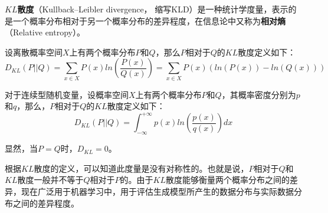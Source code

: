 

\textbf{$KL$散度}（Kullback–Leibler divergence， 缩写KLD）是一种统计学度量，表示的是一个概率分布相对于另一个概率分布的差异程度，在信息论中又称为\textbf{相对熵}（Relative entropy）。

设离散概率空间$X$上有两个概率分布$P$和$Q$，那么$P$相对于$Q$的$KL$散度定义如下：
\begin{equation}
D_{KL}(P||Q)=\sum_{x\in X}P(x)ln(\frac{P(x)}{Q(x)})=\sum_{x\in X}P(x)(ln(P(x))-ln(Q(x)))
\end{equation}

对于连续型随机变量，设概率空间$X$上有两个概率分布$P$和$Q$，其概率密度分别为$p$和$q$，那么，$P$相对于$Q$的$KL$散度定义如下：
\begin{equation}
D_{KL}(P||Q)=\int_{-\infty}^{+\infty}p(x)ln(\frac{p(x)}{q(x)})dx
\end{equation}

显然，当$P=Q$时，$D_{KL}=0$。

根据$KL$散度的定义，可以知道此度量是没有对称性的。也就是说，$P$相对于$Q$和$KL$散度一般并不等于$Q$相对于$P$的。由于$KL$散度能够衡量两个概率分布之间的差异，现在广泛用于机器学习中，用于评估生成模型所产生的数据分布与实际数据分布之间的差异程度。
